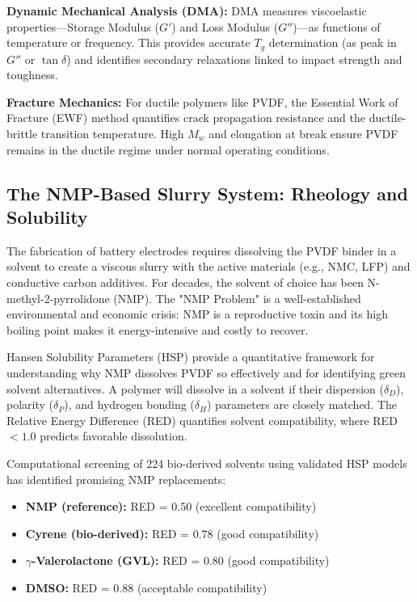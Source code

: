 \documentclass[12pt,a4paper]{article}
\begin{document}
\textbf{Dynamic Mechanical Analysis (DMA):} DMA measures viscoelastic properties—Storage Modulus ($G'$) and Loss Modulus ($G''$)—as functions of temperature or frequency. This provides accurate $T_g$ determination (as peak in $G''$ or $\tan\delta$) and identifies secondary relaxations linked to impact strength and toughness.\citep{ref1}

\textbf{Fracture Mechanics:} For ductile polymers like PVDF, the Essential Work of Fracture (EWF) method quantifies crack propagation resistance and the ductile-brittle transition temperature. High $M_w$ and elongation at break ensure PVDF remains in the ductile regime under normal operating conditions.\citep{ref1}

\subsection{The NMP-Based Slurry System: Rheology and Solubility}

The fabrication of battery electrodes requires dissolving the PVDF binder in a solvent to create a viscous slurry with the active materials (e.g., NMC, LFP) and conductive carbon additives. For decades, the solvent of choice has been N-methyl-2-pyrrolidone (NMP). The "NMP Problem" is a well-established environmental and economic crisis: NMP is a reproductive toxin and its high boiling point makes it energy-intensive and costly to recover.\citep{ref1}

Hansen Solubility Parameters (HSP) provide a quantitative framework for understanding why NMP dissolves PVDF so effectively and for identifying green solvent alternatives. A polymer will dissolve in a solvent if their dispersion ($\delta_{D}$), polarity ($\delta_{P}$), and hydrogen bonding ($\delta_{H}$) parameters are closely matched. The Relative Energy Difference (RED) quantifies solvent compatibility, where RED ${<}1.0$ predicts favorable dissolution. 

Computational screening of 224 bio-derived solvents using validated HSP models has identified promising NMP replacements:\citep{ref43}
\begin{itemize}
  \item \textbf{NMP (reference):} RED = 0.50 (excellent compatibility)
  \item \textbf{Cyrene (bio-derived):} RED = 0.78 (good compatibility)
  \item \textbf{$\gamma$-Valerolactone (GVL):} RED = 0.80 (good compatibility)  
  \item \textbf{DMSO:} RED = 0.88 (acceptable compatibility)
\end{itemize}
\end{document}
